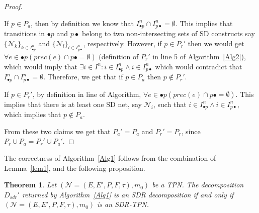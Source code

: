 \documentclass[11pt]{article}
\newtheorem{mythm}{Theorem}
\begin{document}
\begin{proof}
\begin{enumerate}
		If $p \in P_a$, then by definition we know
		that $I_{\bullet p}^n \cap I_{p \bullet}^n = \emptyset$. This implies that 
		transitions in $\bullet p$ and $p \bullet$ belong 
		to two non-intersecting sets of SD constructs say $\{\mathcal{N}_k\}_{k \in I_{\bullet p}^n}$ and 
		$\{\mathcal{N}_l\}_{l \in I_{p\bullet}^n}$, respectively. However, if $p \in P_r'$ then
		we would get 
		$\forall e \in \bullet p 
		(prec(e) \cap p \bullet = \emptyset)$ (definition of $P_r'$ in line 5 of Algorithm~\ref{Alg2}),
		which would imply that $\exists i \in I^n: i \in I_{\bullet p}^n \land i \in I_{p\bullet}^n$ which would contradict 
		that $I_{\bullet p}^n \cap I_{p \bullet}^n = \emptyset$. Therefore, we get that if $p \in P_a$ then $p \notin P_r'$.
		
		If $p \in P_r'$,
		by definition in line of Algorithm, $\forall e \in \bullet p 
		(prec(e) \cap p \bullet = \emptyset)$. This implies that there is at least one SD net, 
		say $\mathcal{N}_i$, such that $i \in I_{\bullet p}^n \land i \in I_{p\bullet}^n$,
		which implies that $p \notin P_a$.
	\end{enumerate} From these two claims we get that $P_a' = P_a$ and $P_r' = P_r$, since $P_r \cup P_a = P_r' \cup P_a'$.
\end{proof}

\noindent The correctness of Algorithm~\ref{Alg1} follows from the combination of Lemma~\ref{lem1}, and the following  proposition. 
\begin{mythm} \label{prop:dsdr}
	Let $(\mathcal{N} = (E, E', P, F, \tau), m_0)$ be a TPN. 
	The decomposition $D_{sdr}'$ returned by Algorithm~\ref{Alg1} 
	is an SDR decomposition
	if and only if $(\mathcal{N} = (E, E', P, F, \tau), m_0)$ is an SDR-TPN.
\end{mythm}
\end{document}
